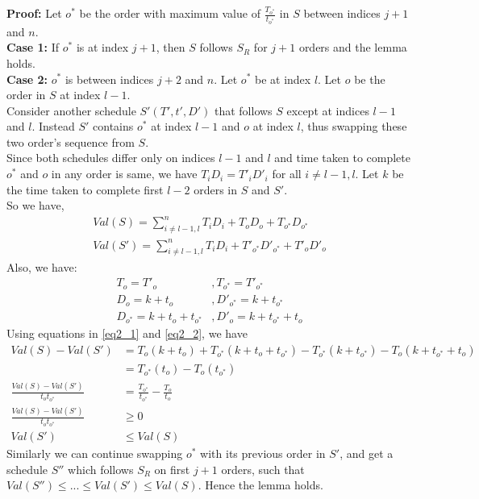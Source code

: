 \documentclass[11pt]{article}
\begin{document}
\begin{enumerate}
    \textbf{Proof:} Let $o^*$ be the order with maximum value of $\frac{T_{o^*}}{t_{o^*}}$ in $S$ between indices $j+1$ and $n$.\\
    \textbf{Case 1:} If $o^*$ is at index $j+1$, then $S$ follows $S_R$ for $j+1$ orders and the lemma holds.\\
    \textbf{Case 2:} $o^*$ is between indices $j+2$ and $n$. Let $o^*$ be at index $l$. Let $o$ be the order in $S$ at index $l-1$.\\
    Consider another schedule $S'(T',t',D')$ that follows $S$ except at indices $l-1$ and $l$. Instead $S'$ contains $o^*$ at index $l-1$ and $o$ at index $l$, thus swapping these two order's sequence from $S$.\\
    Since both schedules differ only on indices $l-1$ and $l$ and time taken to complete $o^*$ and $o$ in any order is same, we have $T_iD_i = T'_iD'_i$ for all $i \neq l-1, l$. Let $k$ be the time taken to complete first $l-2$ orders in $S$ and $S'$.\\
    So we have,
    \begin{equation}\label{eq2_1}
        \begin{split}
            Val(S) = \sum_{i \neq l-1, l}^n T_iD_i + T_oD_o + T_{o^*}D_{o^*}\\
            Val(S') = \sum_{i \neq l-1, l}^n T_iD_i + T'_{o^*}D'_{o^*} + T'_oD'_o
        \end{split}
    \end{equation}
    Also, we have:
    \begin{equation}\label{eq2_2}
        \begin{split}
            T_o = T'_o &, T_{o^*} = T'_{o^*}\\
            D_o = k+t_o &, D'_{o^*} = k + t_{o^*}\\
            D_{o^*} = k+t_o+t_{o^*} &, D'_o= k + t_{o^*} + t_o 
        \end{split}
    \end{equation}
    Using equations in \eqref{eq2_1} and \eqref{eq2_2}, we have
        \begin{equation}
        \begin{split}
            Val(S) - Val(S') &= T_o(k+t_o) + T_{o^*}(k+t_o+t_{o^*}) - T_{o^*}(k + t_{o^*}) - T_o(k + t_{o^*} + t_o)\\
            &= T_{o^*}(t_o) - T_o(t_{o^*})\\
            \frac{Val(S) - Val(S')}{t_ot_{o^*}} &= \frac{T_{o^*}}{t_{o^*}} - \frac{T_o}{t_o}\\
            \frac{Val(S) - Val(S')}{t_ot_{o^*}} &\geq 0\\
            Val(S') &\leq Val(S)
        \end{split}
    \end{equation}
    Similarly we can continue swapping $o^*$ with its previous order in $S'$, and get a schedule $S''$ which follows $S_R$ on first $j+1$ orders, such that $Val(S'') \leq ... \leq Val(S') \leq Val(S)$. Hence the lemma holds.
    

\end{enumerate}
\end{document}
